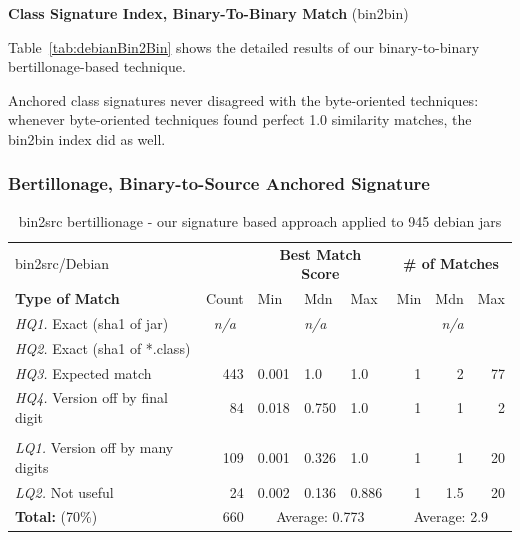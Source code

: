 \textbf{Class Signature Index, Binary-To-Binary Match} (bin2bin)

Table~\ref{tab:debianBin2Bin} shows the detailed results of our binary-to-binary
bertillonage-based technique.

Anchored class signatures never disagreed with the byte-oriented techniques:
whenever byte-oriented techniques found perfect 1.0 similarity matches,
the bin2bin index did as well.



\subsubsection{Bertillonage, Binary-to-Source Anchored Signature}


\begin{table}[h]
  \centering
\begin{tabular}[htbp]{l|r|lll|rrr}
  bin2src/Debian                         &       & \multicolumn{3}{c|}{\textbf{Best Match Score}}  & \multicolumn{3}{c}{\textbf{\# of Matches}} \\
  \textbf{Type of Match}                 & Count & Min   & Mdn   & Max   & Min & Mdn  & Max  \\
  \hline
  \emph{HQ1.} Exact (sha1 of jar)        & \multicolumn{1}{c|}{\emph{n/a}} & & \emph{n/a} & & & \emph{n/a} &  \\
  \emph{HQ2.} Exact (sha1 of *.class)    & & & & & & & \\
  \emph{HQ3.} Expected match             & 443   & 0.001 & 1.0   & 1.0   & 1   & 2    & 77   \\
  \emph{HQ4.} Version off by final digit &  84   & 0.018 & 0.750 & 1.0   & 1   & 1    &  2   \\
  & & & & & & & \\
  \emph{LQ1.} Version off by many digits & 109   & 0.001 & 0.326 & 1.0   & 1   & 1    & 20   \\
  \emph{LQ2.} Not useful                 &  24   & 0.002 & 0.136 & 0.886 & 1   & 1.5  & 20   \\
  \hline
  \textbf{Total:} \hspace{8em}    (70\%) &  660  & \multicolumn{3}{c|}{Average: 0.773}  & \multicolumn{3}{c}{Average: 2.9} \\
\end{tabular}
  \caption{bin2src bertillionage - our signature based approach applied to 945 debian jars}
  \label{tab:debianBin2Src}
\end{table}


